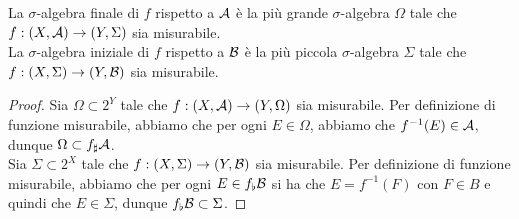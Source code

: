 \documentclass{article}
\renewcommand\A{\mc{A}}
\begin{document}
\begin{remark}{}{}
    La $\sigma$-algebra finale di $f$ rispetto a $\A$ è la più grande $\sigma$-algebra $\Omega$ tale che $f : (X,\A)\to (Y,\Sigma)$ sia misurabile.\\
    La $\sigma$-algebra iniziale di $f$ rispetto a $\mathcal{B}$ è la più piccola $\sigma$-algebra $\Sigma$ tale che $f : (X,\Sigma)\to (Y,\mathcal{B})$ sia misurabile.
    \begin{proof}
        Sia $\Omega \subset 2^Y$ tale che $f : (X,\A)\to (Y,\Omega)$ sia misurabile. Per definizione di funzione misurabile, abbiamo che per ogni $E \in \Omega$, abbiamo che $f^{-1}(E)\in \A$, dunque $\Omega\subset f_\sharp\A$.\\
        Sia $\Sigma \subset 2^X$ tale che $f : (X,\Sigma)\to (Y,\mathcal{B})$ sia misurabile. Per definizione di funzione misurabile, abbiamo che per ogni $E \in f_\flat\mathcal{B}$ si ha che $E = f^{-1}(F)$ con $F \in B$ e quindi che $E \in \Sigma$, dunque $f_\flat\mathcal{B}\subset \Sigma$.
    \end{proof}
\end{remark}
\end{document}
